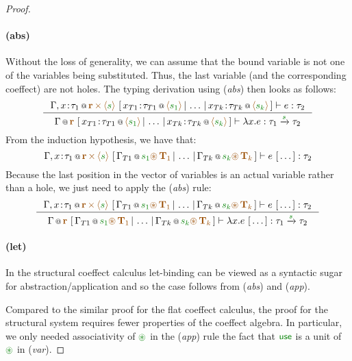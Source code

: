 \begin{proof}
\paragraph{(abs)} Without the loss of generality, we can assume that the bound variable is 
not one of the variables being substituted. Thus, the last variable (and the corresponding coeffect)
are not holes. The typing derivation using (\emph{abs}) then looks as follows:
\[
\inference
  {\coctx{\Gamma, x\!:\!\tau_1}{\aclrd{\textbf{r}}\,\atimes\,\alift{\cclrd{s}}} 
   ~[\,\coctx{x_{T1}\!:\!\tau_{T1}}{\alift{\cclrd{s_1}}} \,|\, \ldots \,|\, \coctx{x_{Tk}\!:\!\tau_{Tk}}{\alift{\cclrd{s_k}}}\,]
    \vdash e : \tau_2}
  {\coctx{\Gamma}{\aclrd{\textbf{r}}} 
   ~[\,\coctx{x_{T1}\!:\!\tau_{T1}}{\alift{\cclrd{s_1}}} \,|\, \ldots \,|\, \coctx{x_{Tk}\!:\!\tau_{Tk}}{\alift{\cclrd{s_k}}}\,]
    \vdash \lambda x.e : \tau_1 \xrightarrow{\cclrd{s}} \tau_2 }
\]
From the induction hypothesis, we have that:
\[
\coctx{\Gamma, x\!:\!\tau_1}{\aclrd{\textbf{r}}\,\atimes\,\alift{\cclrd{s}}}~
 [\,\coctx{\Gamma_{T1}}{\cclrd{s_1}\aseq\,\aclrd{\textbf{T}_1}} \,|\, \ldots \,|\, 
    \coctx{\Gamma_{Tk}}{\cclrd{s_k}\aseq\,\aclrd{\textbf{T}_k}}\,] \vdash e~[\,\ldots\,] : \tau_2
\]
Because the last position in the vector of variables is an actual variable rather than a hole, we
just need to apply the (\emph{abs}) rule:
\[
\inference 
 { \coctx{\Gamma, x\!:\!\tau_1}{\aclrd{\textbf{r}}\,\atimes\,\alift{\cclrd{s}}}~
   [\,\coctx{\Gamma_{T1}}{\cclrd{s_1}\aseq\,\aclrd{\textbf{T}_1}} \,|\, \ldots \,|\, 
      \coctx{\Gamma_{Tk}}{\cclrd{s_k}\aseq\,\aclrd{\textbf{T}_k}}\,] \vdash e~[\,\ldots\,] : \tau_2 }
 { \coctx{\Gamma}{\aclrd{\textbf{r}}}~
   [\,\coctx{\Gamma_{T1}}{\cclrd{s_1}\aseq\,\aclrd{\textbf{T}_1}} \,|\, \ldots \,|\, 
      \coctx{\Gamma_{Tk}}{\cclrd{s_k}\aseq\,\aclrd{\textbf{T}_k}}\,] \vdash \lambda x.e~[\,\ldots\,] : \tau_1 \xrightarrow{\cclrd{s}} \tau_2 }
\]

\paragraph{(let)} In the structural coeffect calculus let-binding can be viewed as a syntactic
sugar for abstraction/application and so the case follows from (\emph{abs}) and (\emph{app}).

\vspace{0.75em}
\noindent
Compared to the similar proof for the flat coeffect calculus, the proof for the structural system
requires fewer properties of the coeffect algebra. In particular, we only needed associativity of 
$\cseq$ in the (\emph{app}) rule the fact that $\cunit$ is a unit of $\cseq$ in (\emph{var}).



\end{proof}
